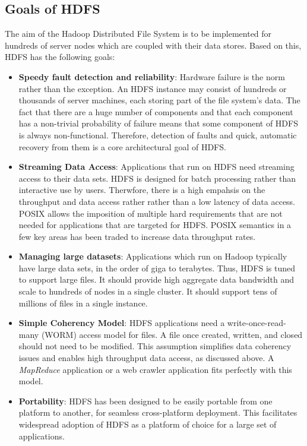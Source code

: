 \documentclass{article}
\begin{document}
\subsection{Goals of HDFS}

The aim of the Hadoop Distributed File System is to be implemented for hundreds of server nodes which are coupled with their data stores. Based on this, HDFS has the following goals:

\begin{itemize}
    \item \textbf{Speedy fault detection and reliability}: Hardware failure is the norm rather than the exception. An HDFS instance may consist of hundreds or thousands of server machines, each storing part of the file system’s data. The fact that there are a huge number of components and that each component has a non-trivial probability of failure means that some component of HDFS is always non-functional. Therefore, detection of faults and quick, automatic recovery from them is a core architectural goal of HDFS.
    
    \item \textbf{Streaming Data Access}: Applications that run on HDFS need streaming access to their data sets. HDFS is designed for batch processing rather than interactive use by users. Therwfore, there is a high empahsis on the throughput and data access rather rather than a low latency of data access. POSIX allows the imposition of multiple hard requirements that are not needed for applications that are targeted for HDFS. POSIX semantics in a few key areas has been traded to increase data throughput rates. 
    
    \item \textbf{Managing large datasets}: Applications which run on Hadoop typically have large data sets, in the order of giga to terabytes. Thus, HDFS is tuned to support large files. It should provide high aggregate data bandwidth and scale to hundreds of nodes in a single cluster. It should support tens of millions of files in a single instance.
    
    \item \textbf{Simple Coherency Model}: HDFS applications need a write-once-read-many (WORM) access model for files. A file once created, written, and closed should not need to be modified. This assumption simplifies data coherency issues and enables high throughput data access, as discussed above. A \textit{MapReduce} application or a web crawler application fits perfectly with this model.
    
    \item \textbf{Portability}: HDFS has been designed to be easily portable from one platform to another, for seamless cross-platform deployment. This facilitates widespread adoption of HDFS as a platform of choice for a large set of applications. 
\end{itemize}
\end{document}
